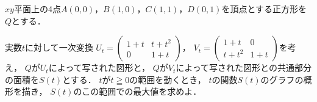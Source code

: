 \documentclass[../../main.tex]{subfiles}
\begin{document}
$xy$平面上の4点$A(0,0)$，$B(1,0)$，$C(1,1)$，$D(0,1)$を頂点とする正方形を$Q$とする．

実数$t$に対して一次変換
$U_t=
\begin{pmatrix} 1+t & t+t^2 \\ 0 & 1+t
\end{pmatrix}$，
$V_t=
\begin{pmatrix} 1+t & 0 \\ t+t^2 & 1+t
\end{pmatrix}$を考え，
$Q$が$U_t$によって写された図形と，
$Q$が$V_t$によって写された図形との共通部分の面積を$S(t)$とする．
$t$が$t\geqq0$の範囲を動くとき，
$t$の関数$S(t)$のグラフの概形を描き，
$S(t)$のこの範囲での最大値を求めよ．
\end{document}
